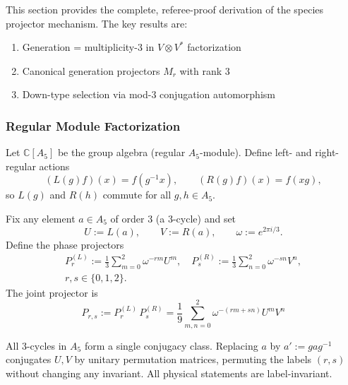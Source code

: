 This section provides the complete, referee-proof derivation of the species 
projector mechanism. The key results are:
\begin{enumerate}
\item Generation = multiplicity-3 in $V \otimes V^*$ factorization
\item Canonical generation projectors $M_r$ with rank 3
\item Down-type selection via mod-3 conjugation automorphism
\end{enumerate}

\subsubsection{Regular Module Factorization}

\begin{definition}
Let $\mathbb{C}[A_5]$ be the group algebra (regular $A_5$-module). Define left- and 
right-regular actions
\begin{equation}
(L(g)f)(x) = f(g^{-1}x), \qquad (R(g)f)(x) = f(xg),
\end{equation}
so $L(g)$ and $R(h)$ commute for all $g, h \in A_5$.
\end{definition}

\begin{definition}
Fix any element $a \in A_5$ of order 3 (a 3-cycle) and set
\begin{equation}
U := L(a), \qquad V := R(a), \qquad \omega := e^{2\pi i/3}.
\end{equation}
Define the phase projectors
\begin{equation}
\begin{gathered}
P^{(L)}_{r} := \frac{1}{3}\sum_{m=0}^{2}\omega^{-rm}U^{m}, \quad
P^{(R)}_{s} := \frac{1}{3}\sum_{n=0}^{2}\omega^{-sn}V^{n}, \\
r,s \in \{0,1,2\}.
\end{gathered}
\end{equation}
The joint projector is
\begin{equation}
\boxed{P_{r,s} := P^{(L)}_{r}\,P^{(R)}_{s} 
= \frac{1}{9}\sum_{m,n=0}^{2}\omega^{-(rm+sn)}U^{m}V^{n}}
\end{equation}
\end{definition}

\begin{remark}
All 3-cycles in $A_5$ form a single conjugacy class. Replacing $a$ by $a' := gag^{-1}$
conjugates $U, V$ by unitary permutation matrices, permuting the labels $(r,s)$ 
without changing any invariant. All physical statements are label-invariant.
\end{remark}

